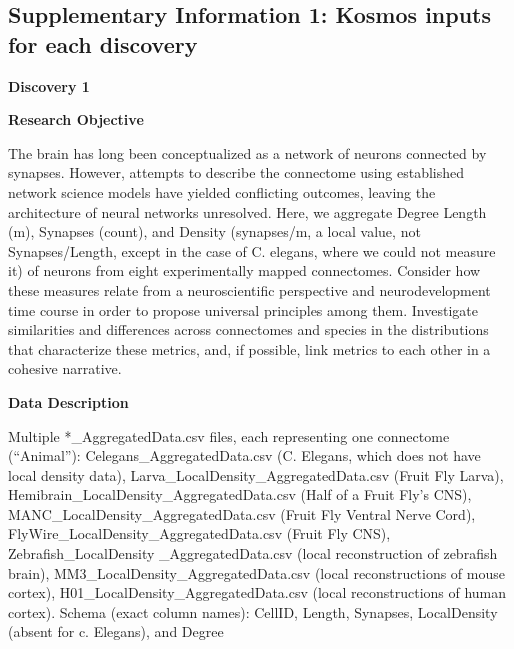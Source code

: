 \documentclass{article}
\begin{document}
\newpage
\subsection*{Supplementary Information 1: Kosmos inputs for each discovery}
\label{sec:supp_inputs}

\vspace{1em}

\noindent \textbf{Discovery 1} \par
\noindent \textbf{Research Objective} \par
The brain has long been conceptualized as a network of neurons connected by synapses. However, attempts to describe the connectome using established network science models have yielded conflicting outcomes, leaving the architecture of neural networks unresolved. Here, we aggregate Degree Length (\textmu m), Synapses (count), and Density (synapses/\textmu m, a local value, not Synapses/Length, except in the case of C. elegans, where we could not measure it) of neurons from eight experimentally mapped connectomes. Consider how these measures relate from a neuroscientific perspective and neurodevelopment time course in order to propose universal principles among them. Investigate similarities and differences across connectomes and species in the distributions that characterize these metrics, and, if possible, link metrics to each other in a cohesive narrative. \par
\noindent \textbf{Data Description} \par
Multiple *\_AggregatedData.csv files, each representing one connectome (“Animal”):
 Celegans\_AggregatedData.csv (C. Elegans, which does not have local density data), Larva\_LocalDensity\_AggregatedData.csv (Fruit Fly Larva), Hemibrain\_LocalDensity\_AggregatedData.csv (Half of a Fruit Fly’s CNS), MANC\_LocalDensity\_AggregatedData.csv (Fruit Fly Ventral Nerve Cord), FlyWire\_LocalDensity\_AggregatedData.csv (Fruit Fly CNS), Zebrafish\_LocalDensity \_AggregatedData.csv (local reconstruction of zebrafish brain), MM3\_LocalDensity\_AggregatedData.csv (local reconstructions of mouse cortex), H01\_LocalDensity\_AggregatedData.csv (local reconstructions of human cortex).
Schema (exact column names): CellID, Length, Synapses, LocalDensity (absent for c. Elegans), and Degree \par

\vspace{1em}
\end{document}
